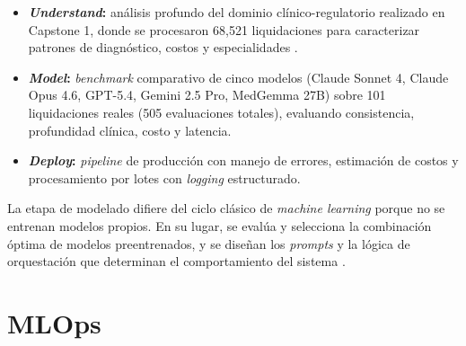 \begin{itemize}
     \item \textbf{\textit{Understand}:} análisis profundo del dominio clínico-regulatorio realizado en Capstone 1, donde se procesaron 68,521 liquidaciones para caracterizar patrones de diagnóstico, costos y especialidades \cite{hurtado2025nexuscare}.

    \item \textbf{\textit{Model}:} \textit{benchmark} comparativo de cinco modelos (Claude Sonnet 4, Claude Opus 4.6, GPT-5.4, Gemini 2.5 Pro, MedGemma 27B) sobre 101 liquidaciones reales (505 evaluaciones totales), evaluando consistencia, profundidad clínica, costo y latencia.

     \item \textbf{\textit{Deploy}:} \textit{pipeline} de producción con manejo de errores, estimación de costos y procesamiento por lotes con \textit{logging} estructurado.   
\end{itemize}
La etapa de modelado difiere del ciclo clásico de \textit{machine learning} porque no se entrenan modelos propios. En su lugar, se evalúa y selecciona la combinación óptima de modelos preentrenados, y se diseñan los \textit{prompts} y la lógica de orquestación que determinan el comportamiento del sistema \cite{sculley2015debt}.

\section{MLOps}

